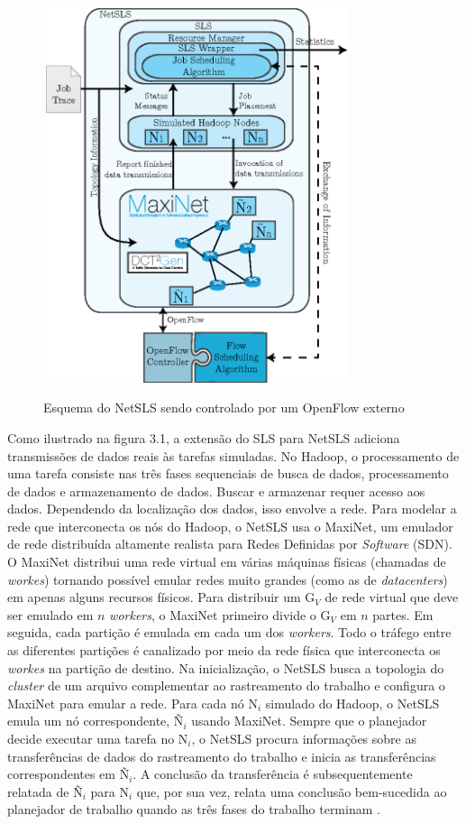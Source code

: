 \begin{figure}[htbp]
    \centering
    \includegraphics[width=9cm, height=11cm]{3-metodologia/Figura_2.jpg}
    \caption{Esquema do NetSLS sendo controlado por um OpenFlow externo}
    \cite{wette2015extending}
    \label{fig:NetSLS}
\end{figure}

Como ilustrado na figura 3.1, a extensão do SLS para NetSLS adiciona transmissões de dados reais às tarefas simuladas. No Hadoop, o processamento de uma tarefa consiste nas três fases sequenciais de busca de dados, processamento de dados e armazenamento de dados. Buscar e armazenar requer acesso aos dados. Dependendo da localização dos dados, isso envolve a rede. Para modelar a rede que interconecta os nós do Hadoop, o NetSLS usa o MaxiNet, um emulador de rede distribuída altamente realista para Redes Definidas por \emph{Software} (SDN). O MaxiNet distribui uma rede virtual em várias máquinas físicas (chamadas de \emph{workes}) tornando possível emular redes muito grandes (como as de \emph{datacenters}) em apenas alguns recursos físicos. Para distribuir um G{$_\mathit{V}$} de rede virtual que deve ser emulado em {$\mathit{n}$} \emph{workers}, o MaxiNet primeiro divide o G{$_\mathit{V}$} em {$\mathit{n}$} partes. Em seguida, cada partição é emulada em cada um dos \emph{workers}. Todo o tráfego entre as diferentes partições é canalizado por meio da rede física que interconecta os \emph{workes} na partição de destino. Na inicialização, o NetSLS busca a topologia do \emph{cluster} de um arquivo complementar ao rastreamento do trabalho e configura o MaxiNet para emular a rede. Para cada nó N{$_\mathit{i}$} simulado do Hadoop, o NetSLS emula um nó correspondente, Ñ{$_\mathit{i}$} usando MaxiNet. Sempre que o planejador decide executar uma tarefa no N{$_\mathit{i}$}, o NetSLS procura informações sobre as transferências de dados do rastreamento do trabalho e inicia as transferências correspondentes em Ñ{$_\mathit{i}$}. A conclusão da transferência é subsequentemente relatada de Ñ{$_\mathit{i}$} para N{$_\mathit{i}$} que, por sua vez, relata uma conclusão bem-sucedida ao planejador de trabalho quando as três fases do trabalho terminam \cite{wette2015extending}.

